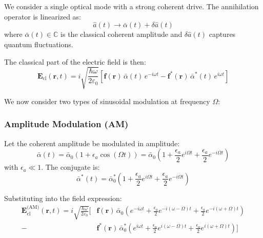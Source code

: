 We consider a single optical mode with a strong coherent drive. The annihilation operator is linearized as:
\begin{equation}
    \hat{a}(t) \to \bar{\alpha}(t) + \delta \hat{a}(t)
\end{equation}
where $\bar{\alpha}(t) \in \mathbb{C}$ is the classical coherent amplitude and $\delta \hat{a}(t)$ captures quantum fluctuations.

The classical part of the electric field is then:
\begin{equation}
    \mathbf{E}_{\text{cl}}(\mathbf{r}, t) = i \sqrt{\frac{\hbar \omega}{2 \varepsilon_0}} \left[
    \mathbf{f}(\mathbf{r})\, \bar{\alpha}(t)\, e^{-i \omega t}
    - \mathbf{f}^*(\mathbf{r})\, \bar{\alpha}^*(t)\, e^{i \omega t}
    \right]
\end{equation}

We now consider two types of sinusoidal modulation at frequency $\Omega$:

\subsubsection*{Amplitude Modulation (AM)}

Let the coherent amplitude be modulated in amplitude:
\begin{equation}
    \bar{\alpha}(t) = \bar{\alpha}_0 \left(1 + \epsilon_a \cos(\Omega t)\right)
    = \bar{\alpha}_0 \left(1 + \frac{\epsilon_a}{2} e^{i\Omega t} + \frac{\epsilon_a}{2} e^{-i\Omega t} \right)
\end{equation}
with $\epsilon_a \ll 1$. The conjugate is:
\begin{equation}
    \bar{\alpha}^*(t) = \bar{\alpha}_0^* \left(1 + \frac{\epsilon_a}{2} e^{i\Omega t} + \frac{\epsilon_a}{2} e^{-i\Omega t} \right)
\end{equation}

Substituting into the field expression:
\begin{align}
    \mathbf{E}_{\text{cl}}^{\text{(AM)}}(\mathbf{r}, t) =
    i \sqrt{\frac{\hbar \omega}{2 \varepsilon_0}} \Big[
    &\mathbf{f}(\mathbf{r})\, \bar{\alpha}_0 \left( e^{-i\omega t} + \frac{\epsilon_a}{2} e^{-i(\omega - \Omega)t} + \frac{\epsilon_a}{2} e^{-i(\omega + \Omega)t} \right) \nonumber \\
    - &\mathbf{f}^*(\mathbf{r})\, \bar{\alpha}_0^* \left( e^{i\omega t} + \frac{\epsilon_a}{2} e^{i(\omega - \Omega)t} + \frac{\epsilon_a}{2} e^{i(\omega + \Omega)t} \right)
    \Big]
\end{align}

